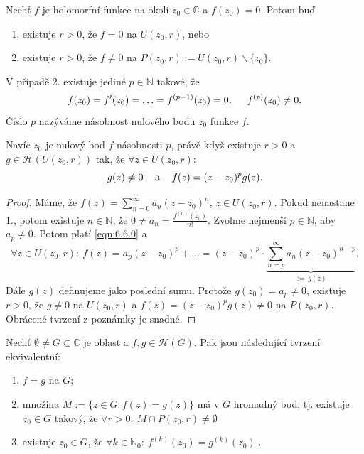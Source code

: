 \newpage
\begin{theorem}
Nechť $f$ je holomorfní funkce na okolí $z_0 \in \mathbb{C}$ a $f(z_0)=0$. Potom buď
\begin{enumerate}
    \item existuje $r>0$, že $f=0$ na $U(z_0,r)$, nebo
    \item existuje $r>0$, že $f\neq 0$ na $P(z_0,r):=U(z_0,r)\backslash \{z_0\}$.
\end{enumerate}
V případě 2. existuje jediné $p\in \mathbb{N}$ takové, že 
\begin{equation}
    f(z_0)=f'(z_0)= \ldots = f^{(p-1)}(z_0)=0,\hspace{5mm}
    f^{(p)}(z_0) \neq 0.
    \label{eqn:6.6.0}
\end{equation}
Číslo $p$ nazýváme násobnost nulového bodu $z_0$ funkce $f$.
\end{theorem}

\begin{note}
Navíc $z_0$ je nulový bod $f$ násobnosti $p$, právě když existuje $r>0$ a $g \in \mathcal{H}(U(z_0,r))$ tak, že $\forall z \in U(z_0,r)$: 
\begin{equation}
    g(z) \neq 0 \hspace{3mm}\text{ a }\hspace{3mm} f(z)=(z-z_0)^p g(z).
    \label{eqn:6.7.t}
\end{equation}
\end{note}

\begin{proof}
Máme, že $f(z)=\sum\limits _{n=0} ^{\infty} a_n(z-z_0)^n$, $z \in U(z_0,r)$. Pokud nenastane 1., potom existuje $n \in \mathbb{N}$, že $0 \neq a_n=\frac{f^{(n)}(z_0)}{n!}$. Zvolme nejmenší $p \in \mathbb{N}$, aby $a_p \neq 0$. Potom platí \cref{eqn:6.6.0} a
\begin{equation}
    \forall z \in U(z_0,r):\ f(z)=a_p(z-z_0)^p + \ldots = (z-z_0)^p \cdot \underset{:=\ g(z)}{\underbrace{\sum\limits_{n=p}^\infty a_n(z-z_0)^{n-p}}}.
\end{equation} 
Dále $g(z)$ definujeme jako poslední sumu. %
Protože $g(z_0)=a_p \neq 0$, existuje $r>0$, že $g \neq 0$ na $U(z_0,r)$ a $f(z)=(z-z_0)^pg(z) \neq 0$ na $P(z_0,r)$. Obrácené tvrzení z poznámky je snadné.
\end{proof}

\begin{theorem}
Nechť $\emptyset \neq G \subset \mathbb{C}$ je oblast a $f,g \in \mathcal{H}(G)$. Pak jsou následující tvrzení ekvivalentní:
\begin{enumerate}
\item $f=g$ na $G$;
\item množina $M:=\{z \in G : f(z)=g(z) \}$ má v $G$ hromadný bod, tj. existuje $z_0 \in G$ takový, že $\forall  r>0:\  M \cap P(z_0,r) \neq \emptyset  \;$
\item existuje $z_0 \in G$, že $\forall k \in \mathbb{N}_0: \ f^{(k)}(z_0)=g^{(k)}(z_0) \;$.
\end{enumerate}
\end{theorem}

